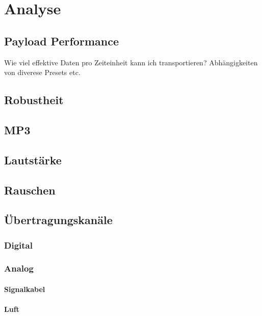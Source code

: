 \chapter{Analyse}
\label{ch:analyse}

\section{Payload Performance}

Wie viel effektive Daten pro Zeiteinheit kann ich transportieren? Abhängigkeiten von diverese Presets etc.

\section{Robustheit}

\section{MP3}

\section{Lautstärke}

\section{Rauschen}

\section{Übertragungskanäle}

\subsection{Digital}

\subsection{Analog}

\subsubsection{Signalkabel}

\subsubsection{Luft}






